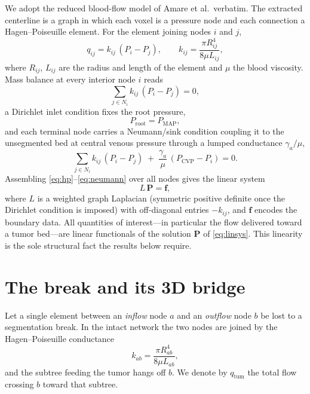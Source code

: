 \documentclass[11pt]{article}
\newcommand{\qtum}{q_{\mathrm{tum}}}
\begin{document}
We adopt the reduced blood-flow model of Amare et al.\ verbatim. The extracted
centerline is a graph in which each voxel is a pressure node and each connection a
Hagen--Poiseuille element. For the element joining nodes $i$ and $j$,
\begin{equation}
q_{ij} = k_{ij}\,(P_i - P_j),
\qquad
k_{ij} = \frac{\pi R_{ij}^{4}}{8\mu L_{ij}},
\label{eq:hp}
\end{equation}
where $R_{ij}$, $L_{ij}$ are the radius and length of the element and $\mu$ the
blood viscosity. Mass balance at every interior node $i$ reads
\begin{equation}
\sum_{j\in N_i} k_{ij}\,(P_i - P_j) = 0,
\label{eq:mass}
\end{equation}
a Dirichlet inlet condition fixes the root pressure,
\begin{equation}
P_{\mathrm{root}} = P_{\mathrm{MAP}},
\label{eq:dirichlet}
\end{equation}
and each terminal node carries a Neumann/sink condition coupling it to the
unsegmented bed at central venous pressure through a lumped conductance
$\gamma_a/\mu$,
\begin{equation}
\sum_{j\in N_i} k_{ij}\,(P_i - P_j) \;+\; \frac{\gamma_a}{\mu}\,(P_{\mathrm{CVP}} - P_i) = 0.
\label{eq:neumann}
\end{equation}
Assembling \eqref{eq:hp}--\eqref{eq:neumann} over all nodes gives the linear system
\begin{equation}
L\,\bm{P} = \bm{f},
\label{eq:linsys}
\end{equation}
where $L$ is a weighted graph Laplacian (symmetric positive definite once the
Dirichlet condition is imposed) with off-diagonal entries $-k_{ij}$, and $\bm{f}$
encodes the boundary data. All quantities of interest---in particular the flow
delivered toward a tumor bed---are linear functionals of the solution $\bm{P}$ of
\eqref{eq:linsys}. This linearity is the sole structural fact the results below
require.

\section{The break and its 3D bridge}
\label{sec:bridge}

Let a single element between an \emph{inflow} node $a$ and an \emph{outflow} node
$b$ be lost to a segmentation break. In the intact network the two nodes are joined
by the Hagen--Poiseuille conductance
\begin{equation}
k_{ab} = \frac{\pi R_{ab}^{4}}{8\mu L_{ab}},
\label{eq:kab}
\end{equation}
and the subtree feeding the tumor hangs off $b$. We denote by $\qtum$ the total flow
crossing $b$ toward that subtree.
\end{document}
